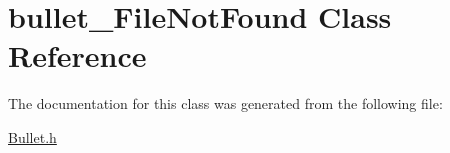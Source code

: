 \hypertarget{classbullet___file_not_found}{}\section{bullet\+\_\+\+File\+Not\+Found Class Reference}
\label{classbullet___file_not_found}


The documentation for this class was generated from the following file\+:\begin{DoxyCompactItemize}
\item 
\hyperlink{_bullet_8h}{Bullet.\+h}\end{DoxyCompactItemize}
